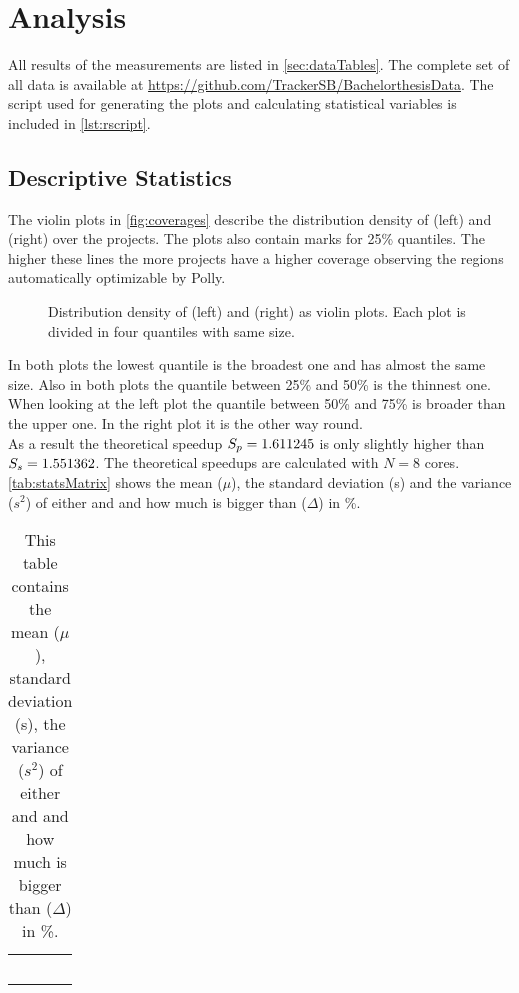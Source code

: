 \chapter{Analysis}
All results of the measurements are listed in \autoref{sec:dataTables}.
The complete set of all data is available at \url{https://github.com/TrackerSB/BachelorthesisData}.
The script used for generating the plots and calculating statistical variables is included in \autoref{lst:rscript}.

\section{Descriptive Statistics}
The violin plots in \autoref{fig:coverages} describe the distribution density of \dyncovs (left) and \dyncovp (right) over the projects.
The plots also contain marks for 25\% quantiles.
The higher these lines the more projects have a higher coverage observing the regions automatically optimizable by Polly.
\begin{figure}[!h]
    \caption[Distribution density of \dyncovs and \dyncovp]{
        Distribution density of \dyncovs (left) and \dyncovp (right) as violin plots.
        Each plot is divided in four quantiles with same size.
    }
    
    \label{fig:coverages}
\end{figure}
In both plots the lowest quantile is the broadest one and has almost the same size.
Also in both plots the quantile between 25\% and 50\% is the thinnest one.
When looking at the left plot the quantile between 50\% and 75\% is broader than the upper one.
In the right plot it is the other way round.\\
As a result the theoretical speedup \(S_p=1.611245\) is only slightly higher than \(S_s=1.551362\).
The theoretical speedups are calculated with \(N=8\) cores.\\
\autoref{tab:statsMatrix} shows the mean (\(\mu\)), the standard deviation (s) and the variance (\(s^2\)) of either \dyncovp and \dyncovs and how much \dyncovp is bigger than \dyncovs (\(\Delta\)) in \%.
\begin{table}[!h]
    \myfloatalign
    \begin{tabularx}{\textwidth}{lCCC}
        \tableheadline{} &  & \tableheadline{\(\Delta\)} & \\\toprule
        \\\bottomrule
    \end{tabularx}
    \caption[Statistical evaluations of \dyncovp and \dyncovs]{
        This table contains the mean (\(\mu\)), standard deviation (s), the variance (\(s^2\)) of either \dyncovp and \dyncovs and how much \dyncovp is bigger than \dyncovs (\(\Delta\)) in \%.
    }
    \label{tab:statsMatrix}
\end{table}
